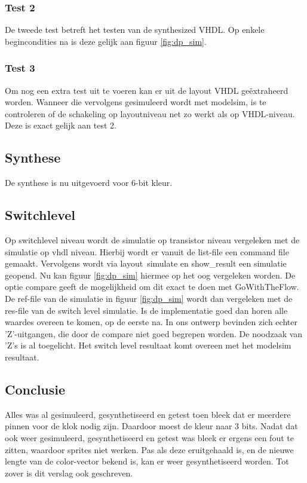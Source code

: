 \documentclass{scrartcl} %
\begin{document}
\subsubsection{Test 2}
De tweede test betreft het testen van de synthesized VHDL. Op enkele begincondities na is deze gelijk aan  figuur \ref{fig:dp_sim}. 

\subsubsection{Test 3}
Om nog een extra test uit te voeren kan er uit de layout VHDL geëxtraheerd worden. Wanneer die vervolgens gesimuleerd wordt met modelsim, is te controleren of de schakeling op layoutniveau net zo werkt als op VHDL-niveau. Deze is exact gelijk aan test 2. 
\subsection{Synthese}
De synthese is nu uitgevoerd voor 6-bit kleur. 


\subsection{Switchlevel}
Op switchlevel niveau wordt de simulatie op transistor niveau vergeleken met de simulatie op vhdl niveau. Hierbij wordt er vanuit de list-file een command file gemaakt. Vervolgens wordt via layout\ simulate en show\_result een simulatie geopend. Nu kan figuur \ref{fig:dp_sim} hiermee op het oog vergeleken worden. De optie compare geeft de mogelijkheid om dit exact te doen met GoWithTheFlow. De ref-file van de simulatie in figuur \ref{fig:dp_sim} wordt dan vergeleken met de res-file van de switch level simulatie. Is de implementatie goed dan horen alle waardes overeen te komen, op de eerste na. In ons ontwerp bevinden zich echter 'Z'-uitgangen, die door de compare niet goed begrepen worden. De noodzaak van 'Z's is al toegelicht. Het switch level resultaat komt overeen met het modelsim resultaat. 





\subsection{Conclusie}
Alles was al gesimuleerd, gesynthetiseerd en getest toen bleek dat er meerdere pinnen voor de klok nodig zijn. Daardoor moest de kleur naar 3 bits. Nadat dat ook weer gesimuleerd, gesynthetiseerd en getest was bleek er ergens een fout te zitten, waardoor sprites niet werken. Pas als deze eruitgehaald is, en de nieuwe lengte van de color-vector bekend is, kan er weer gesynthetiseerd worden. Tot zover is dit verslag ook geschreven. 
\end{document}
